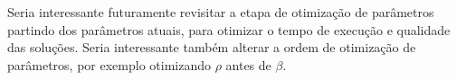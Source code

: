 \documentclass[10pt,twocolumn,letterpaper]{article}
\begin{document}
Seria interessante futuramente revisitar a etapa de otimização de parâmetros partindo dos parâmetros atuais, para otimizar o tempo de execução e qualidade das soluções. Seria interessante também alterar a ordem de otimização de parâmetros, por exemplo otimizando $\rho$ antes de $\beta$.

\printbibliography
\end{document}
